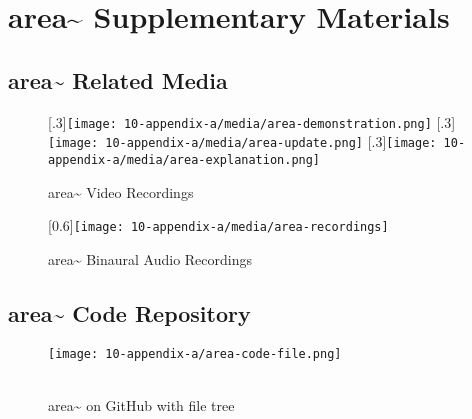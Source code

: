 \chapter{area\textasciitilde{} Supplementary Materials}

\section{area\textasciitilde{} Related Media}
\begin{figure}[!ht]
    \centering
    [.3\linewidth]{\texttt{[image: 10-appendix-a/media/area-demonstration.png]}}%
    \hfill
    [.3\linewidth]{\texttt{[image: 10-appendix-a/media/area-update.png]}}
    \hfill
    [.3\linewidth]{\texttt{[image: 10-appendix-a/media/area-explanation.png]}}
    \caption*{area\textasciitilde{} Video Recordings}
\end{figure}
\vspace*{1cm}
\begin{figure}[!ht]
    \centering
    [0.6\linewidth]{\texttt{[image: 10-appendix-a/media/area-recordings]}}
    \caption*{area\textasciitilde{} Binaural Audio Recordings}
\end{figure}
\clearpage



\section{area\textasciitilde{} Code Repository}
\begin{figure}[!ht]
    \texttt{[image: 10-appendix-a/area-code-file.png]}
    \caption*{ \\ area\textasciitilde{} on GitHub with file tree}
\end{figure}
\clearpage



